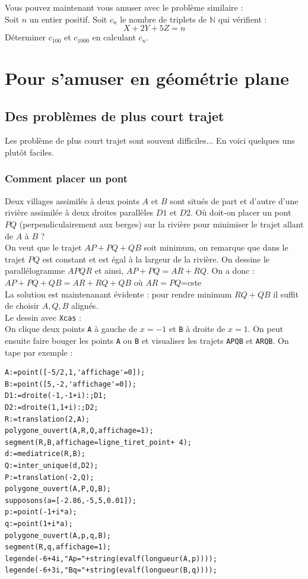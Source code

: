 \documentclass[a4paper,11pt]{book}
\begin{document}
Vous pouvez maintenant vous amuser avec  le probl\`eme similaire :\\ 
Soit $n$ un entier positif. Soit $c_n$ le nombre de triplets de $\mathbb N$
 qui v\'erifient :
$$X+2Y+5Z=n$$
D\'eterminer $c_{100}$ et $c_{1000}$ en calculant $c_n$.

\chapter{Pour s'amuser en g\'eom\'etrie plane}
\section{Des probl\`emes de plus court trajet}
Les probl\`eme de plus court trajet sont souvent difficiles...
En voici quelques uns plut\^ot faciles.  
\subsection{Comment placer un pont}
Deux villages assimil\'es \`a deux points $A$ et $B$ sont situ\'es de part et 
d'autre d'une rivi\`ere assimil\'ee \`a deux droites parall\`eles $D1$ et $D2$.
O\`u doit-on placer un pont $PQ$ (perpendiculairement aux berges) sur la 
rivi\`ere pour minimiser le trajet allant de $A$ \`a $B$ ?\\
On veut que le trajet $AP+PQ+QB$ soit minimum, on remarque que dans le trajet 
$PQ$ est constant et est \'egal \`a la largeur de la rivi\`ere. On 
dessine le parall\'elogramme $APQR$ et ainsi, $AP+PQ=AR+RQ$. 
On a donc :\\ 
$AP+PQ+QB= AR+RQ+QB$ o\`u $AR=PQ$=cste\\
La solution est maintenanant \'evidente : pour rendre minimum $RQ+QB$ il suffit 
de choisir $A,Q,B$ align\'es.\\
Le dessin avec {\tt Xcas} :\\
On clique deux points {\tt A} \`a gauche de $x=-1$ et {\tt B} \`a droite 
de $x=1$.
On peut ensuite faire bouger les points {\tt A} ou {\tt B} et visualiser les 
trajets {\tt APQB} et {\tt ARQB}.  
On tape par exemple :
\begin{verbatim}
A:=point([-5/2,1,'affichage'=0]);
B:=point([5,-2,'affichage'=0]);
D1:=droite(-1,-1+i):;D1;
D2:=droite(1,1+i):;D2;
R:=translation(2,A);
polygone_ouvert(A,R,Q,affichage=1);
segment(R,B,affichage=ligne_tiret_point+ 4);
d:=mediatrice(R,B);
Q:=inter_unique(d,D2);
P:=translation(-2,Q);
polygone_ouvert(A,P,Q,B);
supposons(a=[-2.86,-5,5,0.01]);
p:=point(-1+i*a);
q:=point(1+i*a);
polygone_ouvert(A,p,q,B);
segment(R,q,affichage=1);
legende(-6+4i,"Ap="+string(evalf(longueur(A,p))));
legende(-6+3i,"Bq="+string(evalf(longueur(B,q))));
\end{verbatim}
\end{document}
